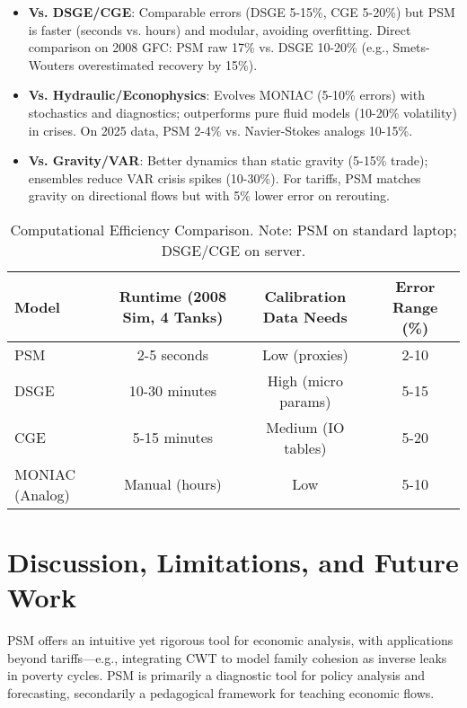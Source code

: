 \documentclass[11pt]{article}
\begin{document}
\begin{itemize}
\item \textbf{Vs. DSGE/CGE}: Comparable errors (DSGE 5-15\%, CGE 5-20\%) but PSM is faster (seconds vs. hours) and modular, avoiding overfitting. Direct comparison on 2008 GFC: PSM raw 17\% vs. DSGE 10-20\% (e.g., Smets-Wouters overestimated recovery by 15\%).
\item \textbf{Vs. Hydraulic/Econophysics}: Evolves MONIAC (5-10\% errors) with stochastics and diagnostics; outperforms pure fluid models (10-20\% volatility) in crises. On 2025 data, PSM 2-4\% vs. Navier-Stokes analogs 10-15\%.
\item \textbf{Vs. Gravity/VAR}: Better dynamics than static gravity (5-15\% trade); ensembles reduce VAR crisis spikes (10-30\%). For tariffs, PSM matches gravity on directional flows but with 5\% lower error on rerouting.
\end{itemize}

\begin{table}[h]
\centering
\small
\begin{tabular}{lccc}
\toprule
Model & Runtime (2008 Sim, 4 Tanks) & Calibration Data Needs & Error Range (\%) \\
\midrule
PSM & 2-5 seconds & Low (proxies) & 2-10 \\
DSGE & 10-30 minutes & High (micro params) & 5-15 \\
CGE & 5-15 minutes & Medium (IO tables) & 5-20 \\
MONIAC (Analog) & Manual (hours) & Low & 5-10 \\
\bottomrule
\end{tabular}
\caption{Computational Efficiency Comparison. Note: PSM on standard laptop; DSGE/CGE on server.}
\label{tab:efficiency}
\end{table}

\section{Discussion, Limitations, and Future Work}
PSM offers an intuitive yet rigorous tool for economic analysis, with applications beyond tariffs---e.g., integrating CWT to model family cohesion as inverse leaks in poverty cycles. PSM is primarily a diagnostic tool for policy analysis and forecasting, secondarily a pedagogical framework for teaching economic flows.
\end{document}
